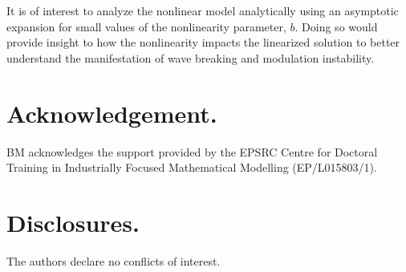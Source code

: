 \documentclass[9pt,twocolumn,twoside]{osajnl}
\begin{document}
It is of interest to analyze the nonlinear model analytically using an asymptotic expansion for small values of the nonlinearity parameter, $b$. Doing so would provide insight to how the nonlinearity impacts the linearized solution to better understand the manifestation of wave breaking and modulation instability.

\section*{Acknowledgement.}
BM acknowledges the support provided by the EPSRC Centre for Doctoral Training in Industrially Focused Mathematical Modelling (EP/L015803/1).

\section*{Disclosures.}
The authors declare no conflicts of interest.


\end{document}
